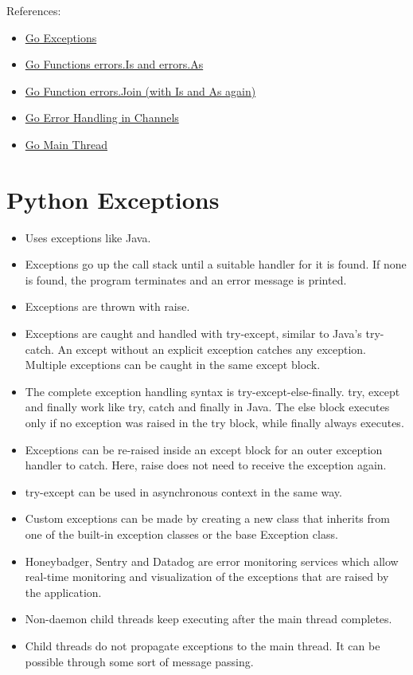 \documentclass[a4paper,11pt]{article}
\theoremstyle{plain}
\theoremstyle{nonumberplain}
\begin{document}
References:

\begin{itemize}
  \item \href{https://www.datadoghq.com/blog/go-error-handling/}{Go Exceptions}
  \item \href{https://medium.com/@caring_smitten_gerbil_914/gos-errors-is-and-errors-as-unwrapping-the-right-way-cff69b374a1f}{Go Functions errors.Is and errors.As}
  \item \href{https://www.bytesizego.com/blog/go-error-chains-how-errors-is-errors-as-and-errors-join-actu}{Go Function errors.Join (with Is and As again)}
  \item \href{https://medium.com/@developer.naren/handling-errors-in-channels-e76ad5cbf3a0}{Go Error Handling in Channels}
  \item \href{https://www.reddit.com/r/golang/comments/1ge1sh7/difference_between_the_main_thread_and_the_go/}{Go Main Thread}
\end{itemize}

\section{Python Exceptions}

\begin{itemize}
  \item Uses exceptions like Java.
  \item Exceptions go up the call stack until a suitable handler for it is found. If none is found, the program terminates and an error message is printed.
  \item Exceptions are thrown with raise.
  \item Exceptions are caught and handled with try-except, similar to Java's try-catch. An except without an explicit exception catches any exception. Multiple exceptions can be caught in the same except block.
  \item The complete exception handling syntax is try-except-else-finally. try, except and finally work like try, catch and finally in Java. The else block executes only if no exception was raised in the try block, while finally always executes.
  \item Exceptions can be re-raised inside an except block for an outer exception handler to catch. Here, raise does not need to receive the exception again.
  \item try-except can be used in asynchronous context in the same way.
  \item Custom exceptions can be made by creating a new class that inherits from one of the built-in exception classes or the base Exception class.
  \item Honeybadger, Sentry and Datadog are error monitoring services which allow real-time monitoring and visualization of the exceptions that are raised by the application.
  \item Non-daemon child threads keep executing after the main thread completes.
  \item Child threads do not propagate exceptions to the main thread. It can be possible through some sort of message passing.
\end{itemize}
\end{document}
